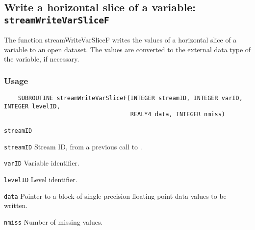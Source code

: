 \subsection{Write a horizontal slice of a variable: \texttt{streamWriteVarSliceF}}
\label{streamWriteVarSliceF}

The function streamWriteVarSliceF writes the values of a horizontal slice of a variable to an open dataset.
The values are converted to the external data type of the variable, if necessary.
\subsubsection*{Usage}

\begin{verbatim}
    SUBROUTINE streamWriteVarSliceF(INTEGER streamID, INTEGER varID, INTEGER levelID, 
                                    REAL*4 data, INTEGER nmiss)
\end{verbatim}

\hspace*{4mm}\begin{minipage}[]{15cm}
\begin{deflist}{\texttt{streamID}\ }
\item[\texttt{streamID}]
Stream ID, from a previous call to {}.
\item[\texttt{varID}]
Variable identifier.
\item[\texttt{levelID}]
Level identifier.
\item[\texttt{data}]
Pointer to a block of single precision floating point data values to be written.
\item[\texttt{nmiss}]
Number of missing values.

\end{deflist}
\end{minipage}
